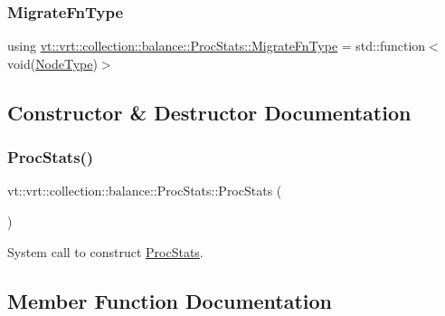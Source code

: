 \subsubsection{\texorpdfstring{Migrate\+Fn\+Type}{MigrateFnType}}
{\footnotesize\ttfamily using \hyperlink{structvt_1_1vrt_1_1collection_1_1balance_1_1_proc_stats_a7cb065ac4de218cb717bc2634782f0cb}{vt\+::vrt\+::collection\+::balance\+::\+Proc\+Stats\+::\+Migrate\+Fn\+Type} =  std\+::function$<$void(\hyperlink{namespacevt_a866da9d0efc19c0a1ce79e9e492f47e2}{Node\+Type})$>$}



\subsection{Constructor \& Destructor Documentation}
\mbox{\label{structvt_1_1vrt_1_1collection_1_1balance_1_1_proc_stats_aa3495f8e610964b594e6dc4d3998d5b2}} 
\subsubsection{\texorpdfstring{Proc\+Stats()}{ProcStats()}}
{\footnotesize\ttfamily vt\+::vrt\+::collection\+::balance\+::\+Proc\+Stats\+::\+Proc\+Stats (\begin{DoxyParamCaption}{ }\end{DoxyParamCaption})\hspace{0.3cm}{\ttfamily [default]}}



System call to construct {\ttfamily \hyperlink{structvt_1_1vrt_1_1collection_1_1balance_1_1_proc_stats}{Proc\+Stats}}. 



\subsection{Member Function Documentation}
\mbox{\label{structvt_1_1vrt_1_1collection_1_1balance_1_1_proc_stats_a21164188d5d1d09724959e95e5c4f2e4}} 
